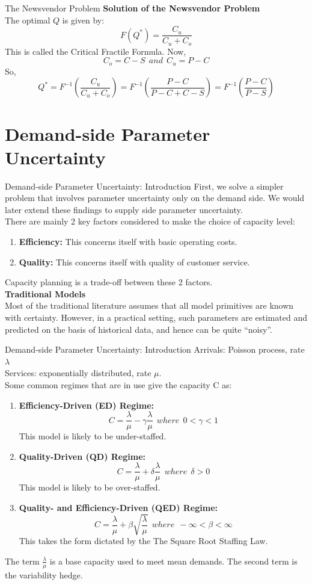 \documentclass[9pt]{beamer}
\begin{document}
\begin{frame}{The Newsvendor Problem}
 \textbf{Solution of the Newsvendor Problem} \\
The optimal $Q$ is given by:
\[F(Q^*)=\frac{C_u}{C_u+C_o}\]
This is called the Critical Fractile Formula. Now,
\[C_o = C-S \ \ and \ \ C_u = P-C \]
So,
\[Q^*=F^{-1}(\frac{C_u}{C_u+C_o}) 
=F^{-1}(\frac{P-C}{P-C+C-S})
=F^{-1}(\frac{P-C}{P-S})\]
\end{frame}
\section{Demand-side Parameter Uncertainty}
\begin{frame}{Demand-side Parameter Uncertainty: Introduction}
    First, we solve a simpler problem that involves parameter uncertainty only on the demand side. We would later extend these findings to supply side parameter uncertainty. \\  
There are mainly 2 key factors considered to make the choice of capacity level: 
\begin{enumerate}
  \item \textbf{Efficiency:} This concerns itself with basic operating costs.
  \item \textbf{Quality:} This concerns itself with quality of customer service.
\end{enumerate}
Capacity planning is a trade-off between these 2 factors. \\ \bigskip
    \textbf{Traditional Models} \\
    Most of the traditional literature assumes that all model primitives are known with certainty. However, in a practical setting, such parameters are estimated and predicted on the basis of historical data, and hence can be quite “noisy”.
\end{frame}


\begin{frame}{Demand-side Parameter Uncertainty: Introduction}
    Arrivals: Poisson process, rate $\lambda$\\ Services: exponentially distributed, rate $\mu$. \\ 
Some common regimes that are in use give the capacity C as:
\begin{enumerate}
  \item \textbf{Efficiency-Driven (ED) Regime:}
  \[ C = \frac{\lambda}{\mu} - \gamma\frac{\lambda}{\mu} \ \ where \ \ 0 < \gamma < 1\]
  This model is likely to be under-staffed.
  \item \textbf{Quality-Driven (QD) Regime:} 
  \[ C = \frac{\lambda}{\mu} + \delta\frac{\lambda}{\mu} \ \ where \ \ \delta >0\]
  This model is likely to be over-staffed.
  \item \textbf{Quality- and Efficiency-Driven (QED) Regime:} 
  \[ C = \frac{\lambda}{\mu} + \beta\sqrt{\frac{\lambda}{\mu}} \ \ where \ \ -\infty<\beta<\infty\]
  This takes the form dictated by the The Square Root Staffing Law.
\end{enumerate}
The term $\frac{\lambda}{\mu}$ is a base capacity used to meet mean demands. The second term is the variability hedge.
\end{frame}    
\end{document}
